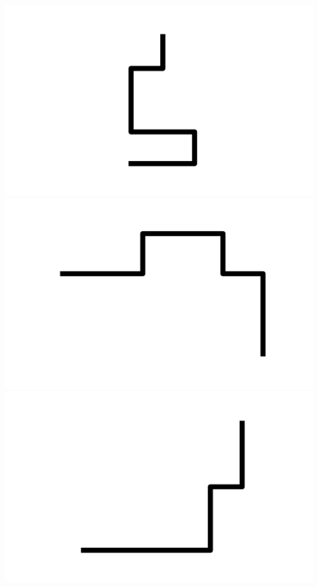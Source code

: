 \documentclass[]{report}
\begin{document}
\includegraphics[scale=.1]{pictures/21/state_cluster_shapes_271.pdf} 
\includegraphics[scale=.1]{pictures/21/state_cluster_shapes_272.pdf} 
\includegraphics[scale=.1]{pictures/21/state_cluster_shapes_273.pdf} 
\end{document}
